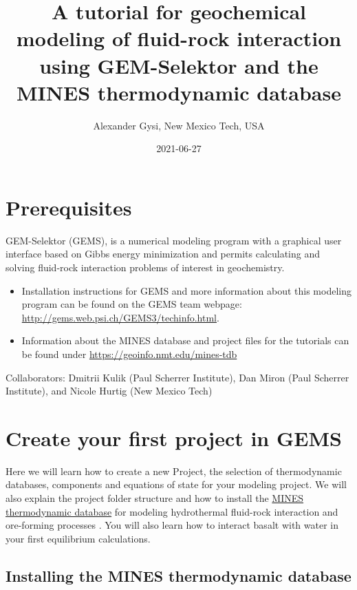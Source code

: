 \documentclass[
]{book}
\title{A tutorial for geochemical modeling of fluid-rock interaction using GEM-Selektor and the MINES thermodynamic database}
\author{Alexander Gysi, New Mexico Tech, USA}
\date{2021-06-27}
\begin{document}
\maketitle

{
\setcounter{tocdepth}{1}
\tableofcontents
}
\hypertarget{prerequisites}{%
\chapter*{Prerequisites}\label{prerequisites}}

GEM-Selektor (GEMS), is a numerical modeling program with a graphical user interface based on Gibbs energy minimization and permits calculating and solving fluid-rock interaction problems of interest in geochemistry.

\begin{itemize}
\item
  Installation instructions for GEMS and more information about this modeling program can be found on the GEMS team webpage: \url{http://gems.web.psi.ch/GEMS3/techinfo.html}.
\item
  Information about the MINES database and project files for the tutorials can be found under \url{https://geoinfo.nmt.edu/mines-tdb}
\end{itemize}

Collaborators:
Dmitrii Kulik (Paul Scherrer Institute), Dan Miron (Paul Scherrer Institute), and Nicole Hurtig (New Mexico Tech)

\hypertarget{intro}{%
\chapter{Create your first project in GEMS}\label{intro}}

Here we will learn how to create a new Project, the selection of thermodynamic databases, components and equations of state for your modeling project. We will also explain the project folder structure and how to install the \href{https://geoinfo.nmt.edu/mines-tdb}{MINES thermodynamic database} for modeling hydrothermal fluid-rock interaction and ore-forming processes . You will also learn how to interact basalt with water in your first equilibrium calculations.

\hypertarget{installing-the-mines-thermodynamic-database}{%
\section{Installing the MINES thermodynamic database}\label{installing-the-mines-thermodynamic-database}}
\end{document}
